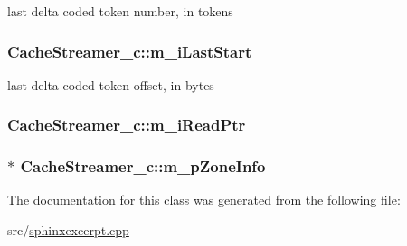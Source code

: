 last delta coded token number, in tokens 

\hypertarget{classCacheStreamer__c_aace345f536da58417518a267f099e728}{
\subsubsection[{m\-\_\-i\-Last\-Start}]{ Cache\-Streamer\-\_\-c\-::m\-\_\-i\-Last\-Start\hspace{0.3cm}{\ttfamily [private]}}}\label{classCacheStreamer__c_aace345f536da58417518a267f099e728}


last delta coded token offset, in bytes 

\hypertarget{classCacheStreamer__c_a0020dc2f13ec4b2019377d00375265a4}{
\subsubsection[{m\-\_\-i\-Read\-Ptr}]{ Cache\-Streamer\-\_\-c\-::m\-\_\-i\-Read\-Ptr\hspace{0.3cm}{\ttfamily [private]}}}\label{classCacheStreamer__c_a0020dc2f13ec4b2019377d00375265a4}
\hypertarget{classCacheStreamer__c_a56b939f9af3ad9c06109a3706a3647c9}{
\subsubsection[{m\-\_\-p\-Zone\-Info}]{$\ast$ Cache\-Streamer\-\_\-c\-::m\-\_\-p\-Zone\-Info}}\label{classCacheStreamer__c_a56b939f9af3ad9c06109a3706a3647c9}


The documentation for this class was generated from the following file\-:\begin{DoxyCompactItemize}
\item 
src/\hyperlink{sphinxexcerpt_8cpp}{sphinxexcerpt.\-cpp}\end{DoxyCompactItemize}
